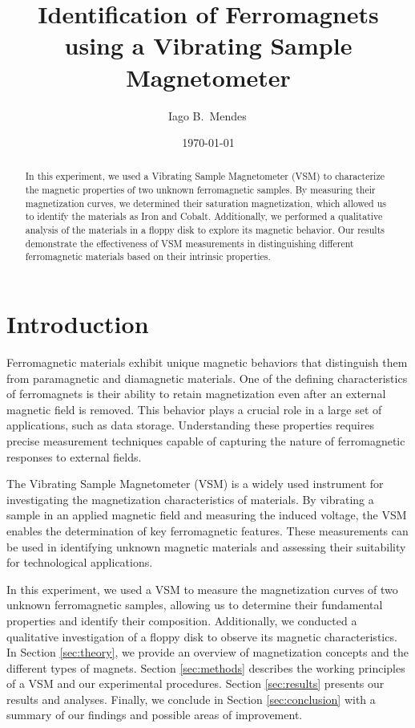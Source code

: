 \documentclass{../paper}
\begin{document}
\title{Identification of Ferromagnets using a Vibrating Sample Magnetometer}

\author{Iago B.~Mendes\,}

\date{\today}

\begin{abstract}
  In this experiment, we used a Vibrating Sample Magnetometer (VSM) to characterize the magnetic properties of two unknown ferromagnetic samples. By measuring their magnetization curves, we determined their saturation magnetization, which allowed us to identify the materials as Iron and Cobalt. Additionally, we performed a qualitative analysis of the materials in a floppy disk to explore its magnetic behavior. Our results demonstrate the effectiveness of VSM measurements in distinguishing different ferromagnetic materials based on their intrinsic properties.
\end{abstract}

\maketitle

\section{Introduction}

Ferromagnetic materials exhibit unique magnetic behaviors that distinguish them from paramagnetic and diamagnetic materials. One of the defining characteristics of ferromagnets is their ability to retain magnetization even after an external magnetic field is removed. This behavior plays a crucial role in a large set of applications, such as data storage. Understanding these properties requires precise measurement techniques capable of capturing the nature of ferromagnetic responses to external fields.

The Vibrating Sample Magnetometer (VSM) is a widely used instrument for investigating the magnetization characteristics of materials. By vibrating a sample in an applied magnetic field and measuring the induced voltage, the VSM enables the determination of key ferromagnetic features. These measurements can be used in identifying unknown magnetic materials and assessing their suitability for technological applications.

In this experiment, we used a VSM to measure the magnetization curves of two unknown ferromagnetic samples, allowing us to determine their fundamental properties and identify their composition. Additionally, we conducted a qualitative investigation of a floppy disk to observe its magnetic characteristics. In Section \ref{sec:theory}, we provide an overview of magnetization concepts and the different types of magnets. Section \ref{sec:methods} describes the working principles of a VSM and our experimental procedures. Section \ref{sec:results} presents our results and analyses. Finally, we conclude in Section \ref{sec:conclusion} with a summary of our findings and possible areas of improvement.
\end{document}
